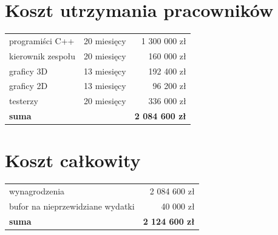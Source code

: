 \documentclass{mwrep}
\begin{document}
\section{Koszt utrzymania pracowników}

\begin{tabular}{llr}
programiści C++ & 20 miesięcy & 1 300 000 zł \\
kierownik zespołu & 20 miesięcy & 160 000 zł \\
graficy 3D & 13 miesięcy & 192 400 zł \\
graficy 2D & 13 miesięcy & 96 200 zł \\
testerzy & 20 miesięcy & 336 000 zł \\
\hline
\textbf{suma} && \textbf{2 084 600 zł}
\end{tabular}

\section{Koszt całkowity}

\begin{tabular}{lr}
wynagrodzenia & 2 084 600 zł \\
bufor na nieprzewidziane wydatki & 40 000 zł \\
\hline
\textbf{suma} & \textbf{2 124 600 zł}
\end{tabular}
\end{document}
